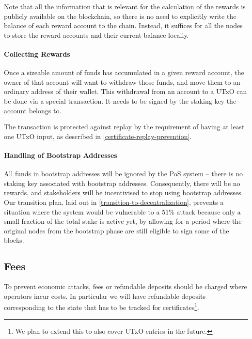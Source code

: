 \documentclass[11pt,a4paper]{article}
\begin{document}
Note that all the information that is relevant for the calculation of
the rewards is publicly available on the blockchain, so there is no
need to explicitly write the balance of each reward account to the
chain. Instead, it suffices for all the nodes to store the reward
accounts and their current balance locally.

\paragraph{Collecting Rewards}

Once a sizeable amount of funds has accumulated in a given reward
account, the owner of that account will want to withdraw those funds,
and move them to an ordinary address of their wallet. This withdrawal
from an account to a UTxO can be done via a special transaction. It
needs to be signed by the staking key the account belongs to.

The transaction is protected against replay by the requirement of having at
least one UTxO input, as described in \cref{certificate-replay-prevention}.

\paragraph{Handling of Bootstrap Addresses}
\label{handling-of-bootstrap-addresses}

All funds in bootstrap addresses will be ignored by the PoS system --
there is no staking key associated with bootstrap
addresses. Consequently, there will be no rewards, and stakeholders
will be incentivised to stop using bootstrap addresses. Our transition
plan, laid out in \cref{transition-to-decentralization}, prevents a
situation where the system would be vulnerable to a 51\% attack
because only a small fraction of the total stake is active yet, by
allowing for a period where the original nodes from the bootstrap
phase are still eligible to sign some of the blocks.

\subsection{Fees}
\label{fees}

To prevent economic attacks, fees or refundable deposits should be
charged where operators incur costs. In particular we will have
refundable deposits corresponding to the state that has to be tracked
for certificates\footnote{We plan to extend this to also cover UTxO entries in
  the future.}.
\end{document}
